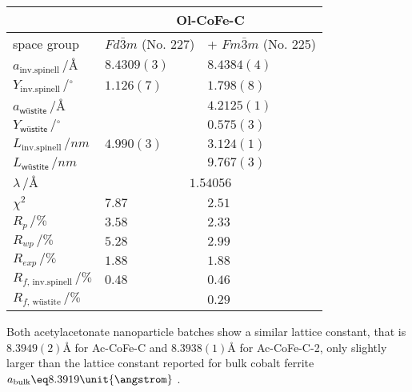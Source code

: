\documentclass[\main/dresen_thesis.tex]{subfiles}
\begin{document}
\begin{table}[ht]
\begin{tabular}{ l | l | l }
      \hline
      \hline
      \rule{0pt}{2ex} & \multicolumn{2}{c}{\textbf{Ol-CoFe-C}}\\
      \hline
      \hline
      \rule{0pt}{2ex}space group & $Fd\bar{3}m$ (No. 227) & + $Fm\bar{3}m$ (No. 225)\\
      \hline
      \rule{0pt}{2ex} $a_\mathrm{inv. spinell} \,/ \unit{\angstrom}$         & $8.4309(3)$ & $8.4384(4)$  \\
      \rule{0pt}{2ex} $Y_\mathrm{inv. spinell} \,/ \unit{^\circ}$            & $1.126(7)$  & $1.798(8)$   \\
      \rule{0pt}{2ex} $a_\textsf{w\"ustite}     \,/ \unit{\angstrom}$        &             & $4.2125(1)$  \\
      \rule{0pt}{2ex} $Y_\textsf{w\"ustite}     \,/ \unit{^\circ}$           &             & $0.575(3)$   \\
      \hline
      \rule{0pt}{2ex} $L_\mathrm{inv. spinell} \,/ \unit{nm}$                & $4.990(3)$  & $3.124(1)$ \\
      \rule{0pt}{2ex} $L_\textsf{w\"ustite}      \,/ \unit{nm}$              &             & $9.767(3)$ \\
      \hline
      \rule{0pt}{2ex} $\lambda \,/ \unit{\angstrom}$  & \multicolumn{2}{c}{$1.54056$}\\
      \hline
      \rule{0pt}{2ex} $\chi^2$                                               & $7.87$      & $2.51$ \\
      \rule{0pt}{2ex} $R_p \,/ \unit{\%}$                                                  & $3.58$      & $2.33$ \\
      \rule{0pt}{2ex} $R_{wp} \,/ \unit{\%}$                                               & $5.28$      & $2.99$ \\
      \rule{0pt}{2ex} $R_{exp} \,/ \unit{\%}$                                              & $1.88$      & $1.88$ \\
      \rule{0pt}{2ex} $R_{f, \, \mathrm{inv. spinell}} \,/ \unit{\%}$                      & $0.48$      & $0.46$ \\
      \rule{0pt}{2ex} $R_{f, \, \text{w\"ustite}} \,/ \unit{\%}$                           &             & $0.29$ \\
      \hline
    \end{tabular}
  \end{table}

    Both acetylacetonate nanoparticle batches show a similar lattice constant, that is $8.3949(2) \unit{\angstrom}$ for Ac-CoFe-C and $8.3938(1) \unit{\angstrom}$ for Ac-CoFe-C-2, only slightly larger than the lattice constant reported for bulk cobalt ferrite $a_\mathrm{bulk} \eq 8.3919 \unit{\angstrom}$ \cite{Stein_2018_Struct}.
\end{document}
